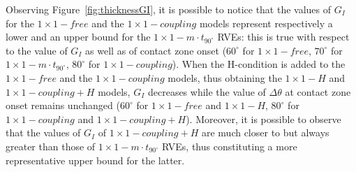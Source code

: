 \documentclass[Review,sagev,times]{sagej}
\begin{document}
Observing Figure~\ref{fig:thicknessGI}, it is possible to notice that the values of $G_{I}$ for the $1\times 1-free$ and the $1\times 1-coupling$ models represent respectively a lower and an upper bound for the $1\times 1-m\cdot t_{90^{\circ}}$ RVEs: this is true with respect to the value of $G_{I}$ as well as of contact zone onset ($60^{\circ}$ for  $1\times 1-free$, $70^{\circ}$ for $1\times 1-m\cdot t_{90^{\circ}}$, $80^{\circ}$ for $1\times 1-coupling$).  When the H-condition is added to the $1\times 1-free$ and the $1\times 1-coupling$ models, thus obtaining the $1\times 1-H$ and $1\times 1-coupling+H$ models, $G_{I}$ decreases while the value of $\Delta\theta$ at contact zone onset remains unchanged ($60^{\circ}$ for  $1\times 1-free$ and $1\times 1-H$, $80^{\circ}$ for $1\times 1-coupling$ and $1\times 1-coupling+H$). Moreover, it is possible to observe that the values of $G_{I}$ of $1\times 1-coupling+H$ are much closer to but always greater than those of $1\times 1-m\cdot t_{90^{\circ}}$ RVEs, thus constituting a more representative upper bound for the latter.\\
\end{document}
